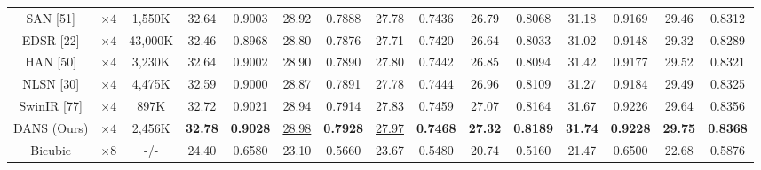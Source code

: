 \documentclass{ieeeaccess}
\begin{document}
\begin{table}
\begin{tabular}{|c|c|c|cc|cc|cc|cc|cc|cc|}
SAN [51]& $\times4$ &1,550K& \multicolumn{1}{c|}{32.64} &0.9003 & \multicolumn{1}{c|}{28.92} & 0.7888 &\multicolumn{1}{c|}{27.78} &0.7436 & \multicolumn{1}{c|}{26.79} &0.8068 & \multicolumn{1}{c|}{31.18} & 0.9169
&\multicolumn{1}{c|}{29.46} &0.8312 \\

EDSR [22] & $\times4$ &43,000K& \multicolumn{1}{c|}{32.46} &0.8968& \multicolumn{1}{c|}{28.80} &0.7876 &\multicolumn{1}{c|}{27.71} &0.7420 & \multicolumn{1}{c|}{26.64 } & 0.8033 & \multicolumn{1}{c|}{31.02} & 0.9148
&\multicolumn{1}{c|}{29.32} &0.8289  \\

HAN [50] & $\times4$ &3,230K& \multicolumn{1}{c|}{32.64 } &0.9002 & \multicolumn{1}{c|}{28.90} &0.7890 &\multicolumn{1}{c|}{27.80} &0.7442& \multicolumn{1}{c|}{26.85} &0.8094 & \multicolumn{1}{c|}{31.42} &0.9177
&\multicolumn{1}{c|}{29.52} &0.8321 \\

NLSN [30] & $\times4$ &4,475K& \multicolumn{1}{c|}{32.59 } &0.9000 & \multicolumn{1}{c|}{28.87} &0.7891 &\multicolumn{1}{c|}{27.78} &0.7444 & \multicolumn{1}{c|}{26.96} &0.8109 & \multicolumn{1}{c|}{31.27} &0.9184
&\multicolumn{1}{c|}{29.49} &0.8325 \\

SwinIR [77] & $\times4$  &897K& \multicolumn{1}{c|}{\color{blue}\underline{32.72}} &{\color{blue}\underline{0.9021}} & \multicolumn{1}{c|}{28.94} &{\color{blue}\underline{0.7914}}& \multicolumn{1}{c|}{27.83} &{\color{blue}\underline{0.7459}} & \multicolumn{1}{c|}{\color{blue}\underline{27.07}} &{\color{blue}\underline{0.8164}}& \multicolumn{1}{c|}{\color{blue}\underline{31.67}} &{\color{blue}\underline{0.9226}} &\multicolumn{1}{c|}{\color{blue}\underline{29.64}} &{\color{blue}\underline{0.8356}}  \\

DANS (Ours) & $\times4$  &2,456K& \multicolumn{1}{c|}{\color{red}\textbf{32.78}} &{\color{red}\textbf{0.9028}}  & \multicolumn{1}{c|}{\color{blue}\underline{28.98}} &{\color{red}\textbf{0.7928}}  & \multicolumn{1}{c|}{\color{blue}\underline{27.97}} &{\color{red}\textbf{0.7468}} & \multicolumn{1}{c|}{\color{red}\textbf{27.32 }} &{\color{red}\textbf{0.8189}}  & \multicolumn{1}{c|}{\color{red}\textbf{31.74}} &{\color{red}\textbf{0.9228}} &\multicolumn{1}{c|}{\color{red}\textbf{29.75}} &{\color{red}\textbf{0.8368}}    \\
\hline

Bicubic&$\times8$ &-/-& \multicolumn{1}{c|}{24.40} &0.6580& \multicolumn{1}{c|}{23.10} &0.5660 & \multicolumn{1}{c|}{23.67} &0.5480& \multicolumn{1}{c|}{20.74} &0.5160 & \multicolumn{1}{c|}{21.47} & 0.6500
&\multicolumn{1}{c|}{22.68} & 0.5876     \\


\end{tabular}
\end{table}
\end{document}
